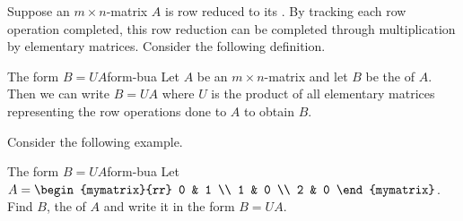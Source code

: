 Suppose an $m \times n$-matrix $A$ is row reduced to its {\rref}. By tracking each row operation completed, this row reduction can be completed through multiplication by elementary matrices. Consider the following definition.

\begin{definition}{The form $B=UA$}{form-bua}
Let $A$ be an $m \times n$-matrix and let $B$ be the {\rref} of $A$. Then we can write $B = UA$ where $U$ is the product of all elementary matrices representing the row operations done to $A$ to obtain $B$. 
\end{definition}

Consider the following example.

\begin{example}{The form $B=UA$}{form-bua}
Let $A = \begin{mymatrix}{rr}
0 & 1 \\
1 & 0 \\
2 & 0
\end{mymatrix}$. Find $B$, the {\rref} of $A$ and write it in the form $B=UA$.
\end{example}

